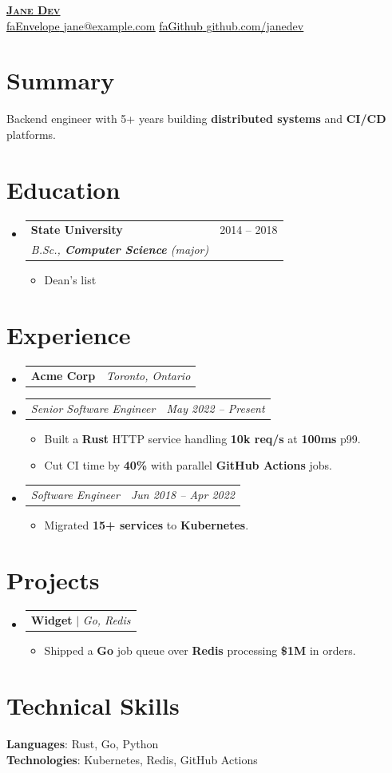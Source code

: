 \documentclass[letterpaper,10.75pt]{article}
\makeatletter
\newcommand{\resumeItem}[1]{
  \item\small{
    {#1 \vspace{-4pt}}
  }
}
\newcommand{\resumeSubheading}[4]{
  \vspace{-2pt}\item
    \begin{tabular*}{0.97\textwidth}[t]{l@{\extracolsep{\fill}}r}
      \textbf{#1} & #2 \\
      \textit{\small#3} & \textit{\small #4} \\
    \end{tabular*}\vspace{-7pt}
}
\newcommand{\resumeOrgHeading}[2]{
  \vspace{-2pt}\item
    \begin{tabular*}{0.97\textwidth}[t]{l@{\extracolsep{\fill}}r}
      \textbf{#1} & \textit{\small#2} \\
    \end{tabular*}\vspace{-7pt}
}
\newcommand{\resumeSubSubheading}[2]{
    \item
    \begin{tabular*}{0.97\textwidth}{l@{\extracolsep{\fill}}r}
      \textit{\small#1} & \textit{\small #2} \\
    \end{tabular*}\vspace{-7pt}
}
\newcommand{\resumeSubSubheadingSpaced}[2]{
    \vspace{3pt}\item
    \begin{tabular*}{0.97\textwidth}{l@{\extracolsep{\fill}}r}
      \textit{\small#1} & \textit{\small #2} \\
    \end{tabular*}\vspace{-7pt}
}
\newcommand{\resumeProjectHeading}[1]{
    \item
    \begin{tabular*}{0.97\textwidth}{l}
      \small#1 \\
    \end{tabular*}\vspace{-7pt}
}
\newcommand{\resumeSubHeadingListStart}{\begin{itemize}[leftmargin=0.15in, label={}]}
\newcommand{\resumeSubHeadingListEnd}{\end{itemize}}
\newcommand{\resumeItemListStart}{\begin{itemize}}
\newcommand{\resumeItemListEnd}{\end{itemize}\vspace{-9pt}}
\newcommand{\seticon}[1]{\textcolor{Black}{\csname #1\endcsname}}
\makeatother
\begin{document}
\begin{center}
    \href{https://example.com}{\textbf{\Huge \scshape Jane Dev}} \\ \vspace{1pt}
    \href{mailto:jane@example.com}{\seticon{faEnvelope} \underline{jane@example.com}} \quad
    \href{https://github.com/janedev}{\seticon{faGithub} \underline{github.com/janedev}}
\end{center}

\section{Summary}
\vspace{2pt}
\small{Backend engineer with 5+ years building \textbf{distributed systems} and \textbf{CI/CD} platforms.}
\vspace{-4pt}

\section{Education}
    \resumeSubHeadingListStart
    \resumeSubheading
    {State University}{2014 -- 2018}
    {B.Sc., \textbf{Computer Science} (major)}{}
    \resumeItemListStart
        \resumeItem{Dean's list}
    \resumeItemListEnd
    \resumeSubHeadingListEnd

\section{Experience}
\resumeSubHeadingListStart

    \resumeOrgHeading
    {Acme Corp}{Toronto, Ontario}
    \resumeSubSubheading
    {Senior Software Engineer}{May 2022 -- Present}
    \resumeItemListStart
        \resumeItem{Built a \textbf{Rust} HTTP service handling \textbf{10k req/s} at \textbf{100ms} p99.}
        \resumeItem{Cut CI time by \textbf{40\%} with parallel \textbf{GitHub Actions} jobs.}
    \resumeItemListEnd

    \resumeSubSubheadingSpaced
    {Software Engineer}{Jun 2018 -- Apr 2022}
    \resumeItemListStart
        \resumeItem{Migrated \textbf{15+ services} to \textbf{Kubernetes}.}
    \resumeItemListEnd

\resumeSubHeadingListEnd

\section{Projects}
\resumeSubHeadingListStart
    \resumeProjectHeading
    {\textbf{Widget} $|$ \emph{Go, Redis}}
    \resumeItemListStart
        \resumeItem{Shipped a \textbf{Go} job queue over \textbf{Redis} processing \textbf{\$1M} in orders.}
    \resumeItemListEnd
\resumeSubHeadingListEnd

\section{Technical Skills}
    \begin{itemize}[leftmargin=0.15in, label={}]
    \small{\item{
        \textbf{Languages}{: Rust, Go, Python} \\
        \textbf{Technologies}{: Kubernetes, Redis, GitHub Actions}
    }}
    \end{itemize}
\end{document}
